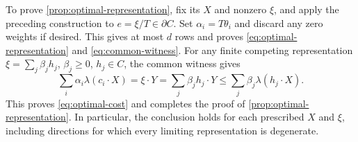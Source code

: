 To prove \cref{prop:optimal-representation}, fix its $X$ and nonzero $\xi$, and apply the preceding construction to $e=\xi/T\in\partial C$. Set $\alpha_i=T\theta_i$ and discard any zero weights if desired. This gives at most $d$ rows and proves \eqref{eq:optimal-representation} and \eqref{eq:common-witness}. For any finite competing representation $\xi=\sum_j\beta_jh_j$, $\beta_j\ge0$, $h_j\in C$, the common witness gives
\[
 \sum_i\alpha_i\lambda(c_i\cdot X)
 =\xi\cdot Y
 =\sum_j\beta_j h_j\cdot Y
 \le\sum_j\beta_j\lambda(h_j\cdot X).
\]
This proves \eqref{eq:optimal-cost} and completes the proof of \cref{prop:optimal-representation}. In particular, the conclusion holds for each prescribed $X$ and $\xi$, including directions for which every limiting representation is degenerate.
